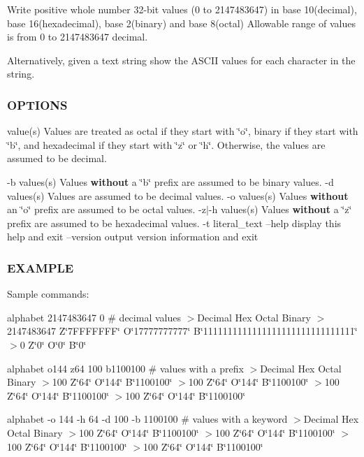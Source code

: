 Write positive whole number 32-\/bit values (0 to 2147483647) in base 10(decimal), base 16(hexadecimal), base 2(binary) and base 8(octal) Allowable range of values is from 0 to 2147483647 decimal.

Alternatively, given a text string show the A\+S\+C\+II values for each character in the string. \subsubsection*{O\+P\+T\+I\+O\+NS}

value(s) Values are treated as octal if they start with \char`\"{}o\char`\"{}, binary if they start with \char`\"{}b\char`\"{}, and hexadecimal if they start with \char`\"{}z\char`\"{} or \char`\"{}h\char`\"{}. Otherwise, the values are assumed to be decimal.

-\/b values(s) Values {\bfseries without} a \char`\"{}b\char`\"{} prefix are assumed to be binary values. -\/d values(s) Values are assumed to be decimal values. -\/o values(s) Values {\bfseries without} an \char`\"{}o\char`\"{} prefix are assumed to be octal values. -\/z$\vert$-\/h values(s) Values {\bfseries without} a \char`\"{}z\char`\"{} prefix are assumed to be hexadecimal values. -\/t literal\+\_\+text --help display this help and exit --version output version information and exit \subsubsection*{E\+X\+A\+M\+P\+LE}

Sample commands\+:

alphabet 2147483647 0 \# decimal values $>$Decimal Hex Octal Binary $>$2147483647 Z\char`\"{}7\+F\+F\+F\+F\+F\+F\+F\char`\"{} O\char`\"{}17777777777\char`\"{} B\char`\"{}1111111111111111111111111111111\char`\"{} $>$0 Z\char`\"{}0\char`\"{} O\char`\"{}0\char`\"{} B\char`\"{}0\char`\"{}

alphabet o144 z64 100 b1100100 \# values with a prefix $>$Decimal Hex Octal Binary $>$100 Z\char`\"{}64\char`\"{} O\char`\"{}144\char`\"{} B\char`\"{}1100100\char`\"{} $>$100 Z\char`\"{}64\char`\"{} O\char`\"{}144\char`\"{} B\char`\"{}1100100\char`\"{} $>$100 Z\char`\"{}64\char`\"{} O\char`\"{}144\char`\"{} B\char`\"{}1100100\char`\"{} $>$100 Z\char`\"{}64\char`\"{} O\char`\"{}144\char`\"{} B\char`\"{}1100100\char`\"{}

alphabet -\/o 144 -\/h 64 -\/d 100 -\/b 1100100 \# values with a keyword $>$Decimal Hex Octal Binary $>$100 Z\char`\"{}64\char`\"{} O\char`\"{}144\char`\"{} B\char`\"{}1100100\char`\"{} $>$100 Z\char`\"{}64\char`\"{} O\char`\"{}144\char`\"{} B\char`\"{}1100100\char`\"{} $>$100 Z\char`\"{}64\char`\"{} O\char`\"{}144\char`\"{} B\char`\"{}1100100\char`\"{} $>$100 Z\char`\"{}64\char`\"{} O\char`\"{}144\char`\"{} B\char`\"{}1100100\char`\"{}

